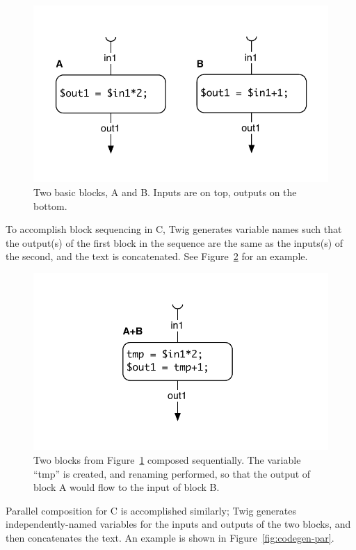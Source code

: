 \begin{figure}[ht]
\centering
\includegraphics[width=0.75\columnwidth]{images/code-gen1}
\caption{Two basic blocks, A and B. Inputs are on top, outputs on the bottom.}
\label{fig:blocks}
\end{figure}

To accomplish block sequencing in C, Twig generates variable names such that the output(s) of the first block in the sequence are the same as the inputs(s) of the second, and the text is concatenated. See Figure~\ref{fig:codegen-seq} for an example.

\begin{figure}[ht]
\centering
\includegraphics[width=0.75\columnwidth]{images/code-gen2}
\caption{Two blocks from Figure~\ref{fig:blocks} composed sequentially. The variable ``tmp'' is created, and renaming performed, so that the output of block A would flow to the input of block B.}
\label{fig:codegen-seq}
\end{figure}

Parallel composition for C is accomplished similarly; Twig generates independently-named variables for the inputs and outputs of the two blocks, and then concatenates the text. An example is shown in Figure~\ref{fig:codegen-par}.

